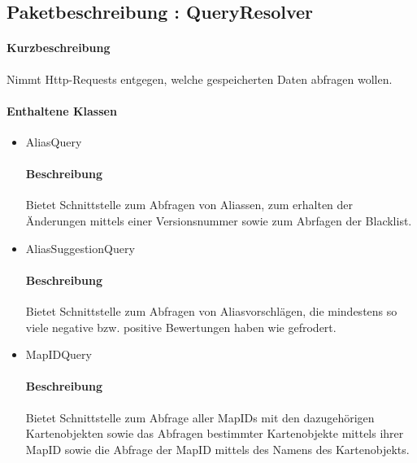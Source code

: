 \subsection{Paketbeschreibung : QueryResolver}%
\paragraph*{Kurzbeschreibung}
Nimmt Http-Requests entgegen, welche gespeicherten Daten abfragen wollen.
\paragraph*{Enthaltene Klassen}
\begin{itemize}
    \item AliasQuery
    		\paragraph*{Beschreibung}
            Bietet Schnittstelle zum Abfragen von Aliassen, zum erhalten der Änderungen mittels einer Versionsnummer sowie zum Abrfagen der Blacklist.
    \item AliasSuggestionQuery
    		\paragraph*{Beschreibung}
    		Bietet Schnittstelle zum Abfragen von Aliasvorschlägen, die mindestens so viele negative bzw. positive Bewertungen haben wie gefrodert.
    \item MapIDQuery
    		\paragraph*{Beschreibung}
    		Bietet Schnittstelle zum Abfrage aller MapIDs mit den dazugehörigen Kartenobjekten sowie das Abfragen bestimmter Kartenobjekte mittels ihrer MapID sowie die Abfrage
            der MapID mittels des Namens des Kartenobjekts.

\end{itemize}